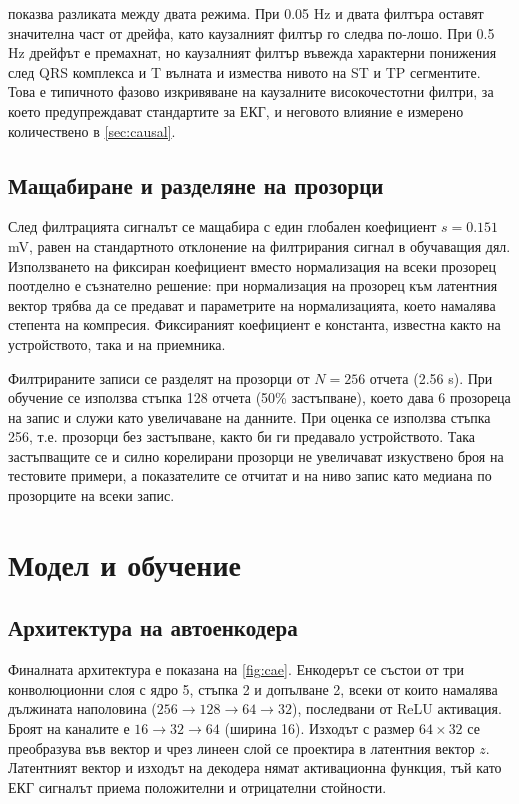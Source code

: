\documentclass[12pt,a4paper]{article}
\begin{document}
 показва разликата между двата режима. При 0.05 Hz и двата филтъра оставят значителна част от дрейфа, като каузалният филтър го следва по-лошо. При 0.5 Hz дрейфът е премахнат, но каузалният филтър въвежда характерни понижения след QRS комплекса и T вълната и измества нивото на ST и TP сегментите. Това е типичното фазово изкривяване на каузалните високочестотни филтри, за което предупреждават стандартите за ЕКГ, и неговото влияние е измерено количествено в \cref{sec:causal}.

\subsection{Мащабиране и разделяне на прозорци}
След филтрацията сигналът се мащабира с един глобален коефициент \(s = 0.151\) mV, равен на стандартното отклонение на филтрирания сигнал в обучаващия дял. Използването на фиксиран коефициент вместо нормализация на всеки прозорец поотделно е съзнателно решение: при нормализация на прозорец към латентния вектор трябва да се предават и параметрите на нормализацията, което намалява степента на компресия. Фиксираният коефициент е константа, известна както на устройството, така и на приемника.

Филтрираните записи се разделят на прозорци от \(N = 256\) отчета (2.56 s). При обучение се използва стъпка 128 отчета (50\% застъпване), което дава 6 прозореца на запис и служи като увеличаване на данните. При оценка се използва стъпка 256, т.е. прозорци без застъпване, както би ги предавало устройството. Така застъпващите се и силно корелирани прозорци не увеличават изкуствено броя на тестовите примери, а показателите се отчитат и на ниво запис като медиана по прозорците на всеки запис.

\section{Модел и обучение}

\subsection{Архитектура на автоенкодера}
Финалната архитектура е показана на \cref{fig:cae}. Енкодерът се състои от три конволюционни слоя с ядро 5, стъпка 2 и допълване 2, всеки от които намалява дължината наполовина (\(256 \rightarrow 128 \rightarrow 64 \rightarrow 32\)), последвани от ReLU активация. Броят на каналите е \(16 \rightarrow 32 \rightarrow 64\) (ширина 16). Изходът с размер \(64 \times 32\) се преобразува във вектор и чрез линеен слой се проектира в латентния вектор \(z\). Латентният вектор и изходът на декодера нямат активационна функция, тъй като ЕКГ сигналът приема положителни и отрицателни стойности.
\end{document}
